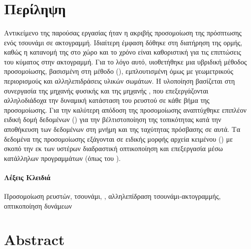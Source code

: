 \section*{Περίληψη}
\paragraph{} Αντικείμενο της παρούσας εργασίας ήταν η ακριβής προσομοίωση της
πρόσ\-πτω\-σης ενός τσουνάμι σε ακτογραμμή. Ιδιαίτερη έμφαση δόθηκε στη διατήρηση της
ορμής, καθώς η κατανομή της στο χώρο και το χρόνο είναι καθοριστική για τις επιπτώσεις του
κύματος στην ακτογραμμή. Για το λόγο αυτό, υιοθετήθηκε μια υβριδική μέθοδος προσομοίωσης,
βασισμένη στη μέθοδο  (), εμπλουτισμένη όμως
με γεωμετρικούς περιορισμούς και αλληλεπιδράσεις υλικών σωμάτων. Η υλοποίηση βασίζεται στη
συνεργασία της μηχανής φυσικής  και της μηχανής , που επεξεργάζονται
αλληλοδιάδοχα την δυναμική κατάσταση του ρευστού σε κάθε βήμα της προσομοίωσης. Για την
καλύτερη απόδοση της προσομοίωσης αναπτύχθηκε επιπλέον ειδική δομή δεδομένων () για την βέλτιστοποίηση της τοπικότητας κατά την αποθήκευση των δεδομένων στη
μνήμη και της ταχύτητας πρόσβασης σε αυτά. Τα δεδομένα της προσομοίωσης εξάγονται σε
ειδικής μορφής αρχεία κειμένου () με σκοπό την εκ των υστέρων διαδραστική
οπτικοποίηση και επεξεργασία μέσω κατάλληλων προγραμμάτων (όπως του ).

\paragraph{Λέξεις Κλειδιά} Προσομοίωση ρευστών, τσουνάμι, , αλληλεπίδραση
τσουνάμι-α\-κτο\-γραμ\-μής, οπτικοποίηση δυνάμεων
\clearpage
\section*{Abstract}
